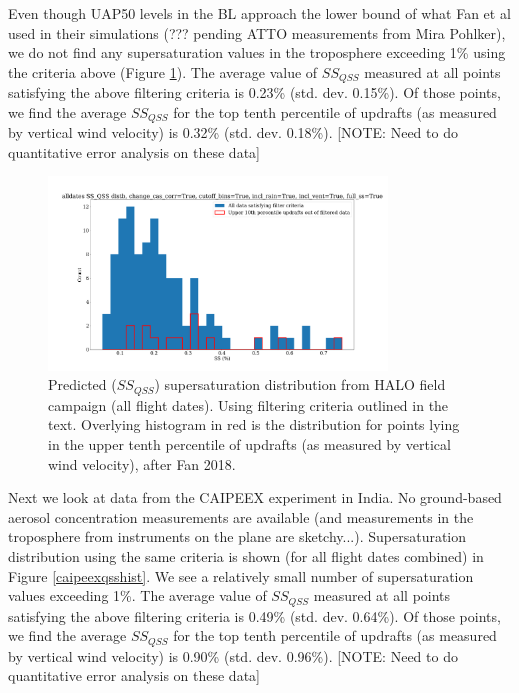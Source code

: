 \documentclass{article}
\begin{document}
Even though UAP50 levels in the BL approach the lower bound of what Fan et al used in their simulations (??? pending ATTO measurements from Mira Pohlker), we do not find any supersaturation values in the troposphere exceeding 1\% using the criteria above (Figure \ref{haloqsshist}). The average value of $SS_{QSS}$ measured at all points satisfying the above filtering criteria is 0.23\% (std. dev. 0.15\%). Of those points, we find the average $SS_{QSS}$ for the top tenth percentile of updrafts (as measured by vertical wind velocity) is 0.32\% (std. dev. 0.18\%). [NOTE: Need to do quantitative error analysis on these data]

\clearpage
\newpage

\begin{figure}[ht]
    \centering
    \includegraphics[width=9cm]{revhalo/v24_with_up10perc_ss_qss_hist_cas_alldates_figure.png}
    \caption{Predicted ($SS_{QSS}$) supersaturation distribution from HALO field campaign (all flight dates). Using filtering criteria outlined in the text. Overlying histogram in red is the distribution for points lying in the upper tenth percentile of updrafts (as measured by vertical wind velocity), after Fan 2018.}
    \label{haloqsshist}
\end{figure}

Next we look at data from the CAIPEEX experiment in India. No ground-based aerosol concentration measurements are available (and measurements in the troposphere from instruments on the plane are sketchy...). Supersaturation distribution using the same criteria is shown (for all flight dates combined) in Figure \ref{caipeexqsshist}. We see a relatively small number of supersaturation values exceeding 1\%. The average value of $SS_{QSS}$ measured at all points satisfying the above filtering criteria is 0.49\% (std. dev. 0.64\%). Of those points, we find the average $SS_{QSS}$ for the top tenth percentile of updrafts (as measured by vertical wind velocity) is 0.90\% (std. dev. 0.96\%). [NOTE: Need to do quantitative error analysis on these data]
\end{document}
